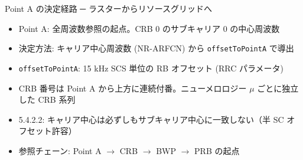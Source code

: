 \begin{frame}{Point A の決定経路 ─ ラスターからリソースグリッドへ}
\begin{itemize}
  \item Point A: 全周波数参照の起点。CRB 0 のサブキャリア 0 の中心周波数
  \item 決定方法: キャリア中心周波数 (NR-ARFCN) から \texttt{offsetToPointA} で導出
  \item \texttt{offsetToPointA}: 15 kHz SCS 単位の RB オフセット (RRC パラメータ)
  \item CRB 番号は Point A から上方に連続付番。ニューメロロジー $\mu$ ごとに独立した CRB 系列
  \item 5.4.2.2: キャリア中心は必ずしもサブキャリア中心に一致しない（半 SC オフセット許容）
  \item 参照チェーン: Point A $\to$ CRB $\to$ BWP $\to$ PRB の起点
\end{itemize}
\end{frame}
